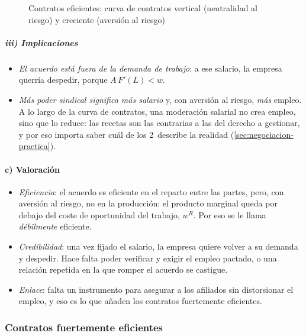 \documentclass[11pt]{article}
\begin{document}
\begin{figure}[H]
\centering
\caption{Contratos eficientes: curva de contratos vertical (neutralidad al riesgo) y creciente (aversión al riesgo)}\label{fig:contratos-eficientes}
\end{figure}

\subparagraph{iii) Implicaciones}

\begin{itemize}
\item \emph{El acuerdo está fuera de la demanda de trabajo}: a ese salario, la empresa querría despedir, porque $A\,F'(L)<w$.
\item \emph{Más poder sindical significa más salario} y, con aversión al riesgo, \emph{más} empleo. A lo largo de la curva de contratos, una moderación salarial no crea empleo, sino que lo reduce: las recetas son las contrarias a las del derecho a gestionar, y por eso importa saber cuál de los 2~describe la realidad (\ref{sec:negociacion-practica}).
\end{itemize}

\paragraph{c) Valoración}

\begin{itemize}
\item \emph{Eficiencia}: el acuerdo es eficiente en el reparto entre las partes, pero, con aversión al riesgo, no en la producción: el producto marginal queda por debajo del coste de oportunidad del trabajo, $w^R$. Por eso se le llama \emph{débilmente} eficiente.
\item \emph{Credibilidad}: una vez fijado el salario, la empresa quiere volver a su demanda y despedir. Hace falta poder verificar y exigir el empleo pactado, o una relación repetida en la que romper el acuerdo se castigue\nocite{EspinosaRhee1989Efficient}.
\item \emph{Enlace}: falta un instrumento para asegurar a los afiliados sin distorsionar el empleo, y eso es lo que añaden los contratos fuertemente eficientes.
\end{itemize}

\subsubsection{Contratos fuertemente eficientes}\label{sec:fuertemente-eficientes}
\end{document}
